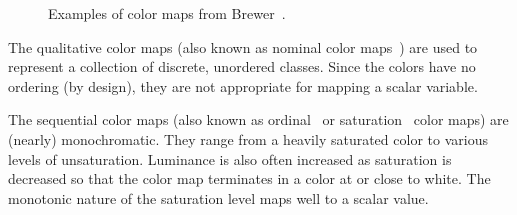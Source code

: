 \documentclass[review,journal]{vgtc}         %
\newcommand{\lcite}[1]{~\cite{#1}}
\newcommand{\scite}[1]{~\cite{#1}}
\begin{document}
\begin{figure}
  \centering
  \quad
  \quad
  \caption{Examples of color maps from Brewer\scite{Brewer05}.}
  \label{fig:BrewerExamples}
\end{figure}

The qualitative color maps (also known as nominal color maps\lcite{Ware04})
are used to represent a collection of discrete, unordered classes.  Since
the colors have no ordering (by design), they are not appropriate for
mapping a scalar variable.

The sequential color maps (also known as ordinal\lcite{Ware04} or
saturation\lcite{Rheingans99} color maps) are (nearly) monochromatic.  They
range from a heavily saturated color to various levels of unsaturation.
Luminance is also often increased as saturation is decreased so that the
color map terminates in a color at or close to white.  The monotonic nature
of the saturation level maps well to a scalar value.
\end{document}
